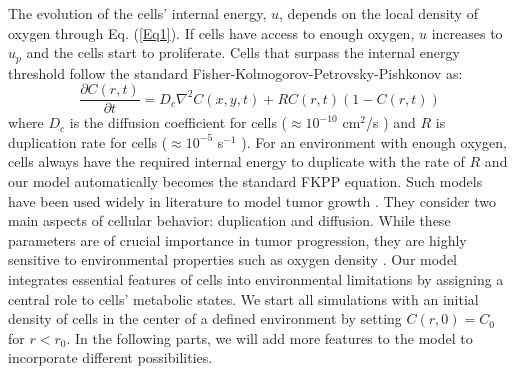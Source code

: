 \documentclass[aps,prl, superscriptaddress,groupedaddress]{revtex4}  %
\begin{document}
	The evolution of the cells' internal energy, $u$, depends on the local density of oxygen through Eq. (\ref{Eq1}). If cells have access to enough oxygen, $u$ increases to $u_p$ and the cells start to proliferate. Cells that surpass the internal energy threshold follow the standard Fisher-Kolmogorov-Petrovsky-Pishkonov \cite{murray2003mathematical} as: 
	\begin{equation}
		\frac{\partial C(r,t)}{\partial t}=D_c \nabla^2C(x,y,t)+R C(r,t)(1-C(r,t))
		\label{Eq3}
	\end{equation}
	where $D_c$ is the diffusion coefficient  for cells ($\approx 10^{-10}$ cm$^2$/s \cite{anderson2005hybrid}) and $R$ is duplication rate for cells ($\approx 10^{-5}$ s$^{-1}$ \cite{anderson2005hybrid}). For an environment with enough oxygen, cells always have the required internal energy to duplicate with the rate of $R$ and our model automatically becomes the standard FKPP equation.  Such models have been used widely in literature to model tumor growth \cite{swanson2003virtual, mandonnet2003continuous, harpold2007evolution}. They consider two main aspects of cellular behavior: duplication and diffusion. While these parameters are of crucial importance in tumor progression, they are highly sensitive to environmental properties such as oxygen density \cite{hanahan2000hallmarks, hanahan2011hallmarks, whiteside2008tumor}. Our model integrates essential features of cells into environmental limitations by assigning a central role to cells' metabolic states.  We start all simulations with an initial density of cells in the center of a defined environment by setting $C(r,0)=C_0$ for $r<r_0$.  In the following parts, we will add more features to the model to incorporate different possibilities.  
	
\end{document}
